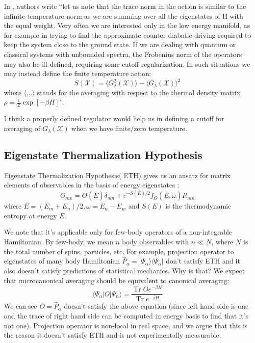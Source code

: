 \documentclass[11pt,a4paper]{article}
\DeclareMathOperator{\Tr}{Tr}
\begin{document}
In \cite{kolodrubetz2016geometry}, authors write ``let us note that the trace norm in the action is similar to the infinite temperature norm as we are summing over all the eigenstates of H with the equal weight. Very often we are interested only in the low energy manifold, as for example in trying to find the approximate counter-diabatic driving required to keep the system close to the ground state. If we are dealing with quantum or classical systems with unbounded spectra, the Frobenius norm of the operators may also be ill-defined, requiring some cutoff regularization. In such
situations we may instead define the finite temperature action:
\begin{equation}
S( \mathcal{X})= \langle G_{\lambda}^2( \mathcal{X}) \rangle - \langle G_{\lambda}( \mathcal{X}) \rangle ^2
\end{equation}
where $\langle \ldots \rangle$ stands for the averaging with respect to the thermal density matrix $\rho= \frac{1}{Z} \exp[-\beta H]$".

I think a properly defined regulator would help us in defining a cutoff for averaging of $G_{\lambda}(\mathcal{X} )$ when we have finite/zero temperature.

\subsection{Eigenstate Thermalization Hypothesis}
Eigenstate Thermalization Hypothesis( ETH) gives us an ansatz for matrix elements of observables in the basis of energy eigenstates  \cite{d2016quantum}:
\begin{equation}
O_{mn}= O( \bar{E}) \delta_{mn} + e^{-S(\bar{E})/2} f_O(\bar{E}, \omega) R_{mn}
\end{equation}
where $\bar{E}= (E_m +E_n)/2, \omega= E_n- E_m$ and $S(E)$ is the thermodynamic entropy at energy $E$.

We note that it's applicable only for few-body operators of a non-integrable Hamiltonian. By few-body, we mean $n$ body observables with $n \ll N$, where $N$ is the total number of spins, particles, etc. For example, projection operator to eigenstates of many body  Hamiltonian $\hat{P}_{\alpha}= |\Psi_{\alpha} \rangle \langle\Psi_{\alpha}  |$ don't satisfy ETH and it also doesn't satisfy predictions of statistical mechanics. Why is that? We expect that microcanonical averaging should be equivalent to canonical averaging:
\begin{equation}
 \langle\Psi_{\alpha}  |O|\Psi_{\alpha} \rangle= \dfrac{\Tr O e^{-\beta H}}{\Tr e^{-\beta H}}
\end{equation}
We can see $O= \hat{P}_{\alpha}$ doesn't satisfy the above equation (since left hand side is one and the trace of right hand side can be computed in energy basis to find that it's not one). Projection operator is non-local in real space, and we argue that this is the reason it doesn't satisfy ETH and is not experimentally measurable.
\end{document}
